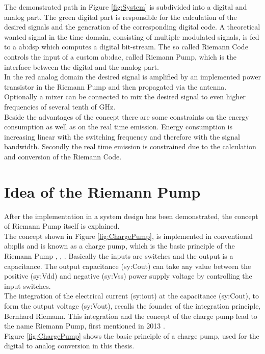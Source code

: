 The demonstrated path in Figure \ref{fig:System} is subdivided into a digital and analog part.
The green digital part is responsible for the calculation of the desired signals and the generation of the corresponding digital code.
A theoretical wanted signal in the time domain, consisting of multiple modulated signals, is fed to a \gls{ab:dsp} which computes a digital bit-stream.
The so called Riemann Code controls the input of a custom \gls{ab:dac}, called Riemann Pump, which is the interface between the digital and the analog part.\\
In the red analog domain the desired signal is amplified by an implemented power transistor in the Riemann Pump and then propagated via the antenna.
Optionally a mixer can be connected to mix the desired signal to even higher frequencies of several tenth of \si{\giga \hertz}.\\
Beside the advantages of the concept there are some constraints on the energy consumption as well as on the real time emission.
Energy consumption is increasing linear with the switching frequency and therefore with the signal bandwidth.
Secondly the real time emission is constrained due to the calculation and conversion of the Riemann Code.

\section{Idea of the Riemann Pump}
\label{IdeaRiemannPump}
After the implementation in a system design has been demonstrated, the concept of Riemann Pump itself is explained.\\
The concept shown in Figure \ref{fig:ChargePump}, is implemented in conventional \glspl{ab:pll} and is known as a charge pump, which is the basic principle of the Riemann Pump \cite{DevalRivetVeyracEtAl2013}, \cite{VeyracRivetDevalEtAl2014}, \cite{DevalRivetVeyrac2015}.
Basically the inputs are switches and the output is a capacitance.
The output capacitance (\gls{sy:Cout}) can take any value between the positive (\gls{sy:Vdd}) and negative (\gls{sy:Vss}) power supply voltage by controlling the input switches.\\
 The integration of the electrical current (\gls{sy:iout}) at the capacitance (\gls{sy:Cout}), to form the output voltage  (\gls{sy:Vout}), recalls the founder of the integration principle, Bernhard Riemann.
This integration and the concept of the charge pump lead to the name Riemann Pump, first mentioned in 2013 \cite{DevalRivetVeyracEtAl2013}. \\
Figure \ref{fig:ChargePump} shows the basic principle of a charge pump, used for the digital to analog conversion in this thesis.

